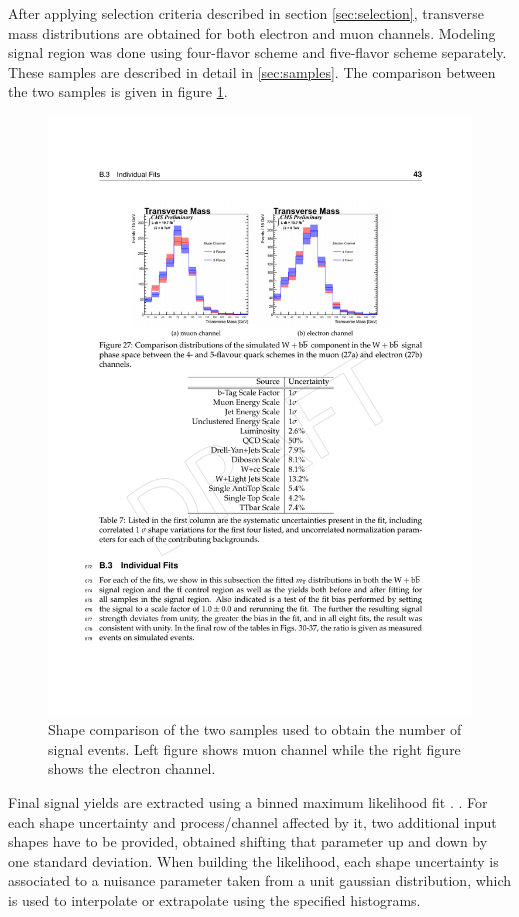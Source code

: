 After applying selection criteria described in section \ref{sec:selection}, transverse mass distributions are obtained for both electron and muon channels. Modeling signal region was done using four-flavor scheme and five-flavor scheme separately. These samples are described in detail in \ref{sec:samples}. The comparison between the two samples is given in figure \ref{fig:4fsvs5fs}.
\begin{figure}[htbp]
	\centering
		\includegraphics[width=\textwidth]{Figures/4fsvs5fs.pdf}
	\caption[Comparison of the two W+bb samples used to obtain the number of signal events.]{Shape comparison of the two samples used to obtain the number of signal events. Left figure shows muon channel while the right figure shows the electron channel.}
	\label{fig:4fsvs5fs}
\end{figure}

Final signal yields are extracted using a binned maximum likelihood fit . . 
For each shape uncertainty and process/channel affected by it, two additional input shapes have to be provided, obtained shifting that parameter up and down by one standard deviation. When building the likelihood, each shape uncertainty is associated to a nuisance parameter taken from a unit gaussian distribution, which is used to interpolate or extrapolate using the specified histograms.

